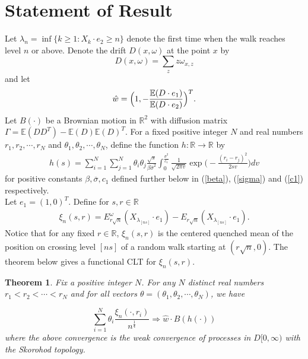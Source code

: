 \documentclass[11pt]{amsart}
\newtheorem{theorem}{\sc Theorem}[section]
\begin{document}
\bigskip

\section{Statement of Result}

Let $\lambda_n = \inf \{k\ge 1:X_k \cdot e_2 \geq n \}$ denote the first time when the walk reaches level $n$ or above. Denote the drift $D(x,\omega)$ at the point $x$ by 
\[ D(x,\omega) = \sum_{z}z \omega_{x,z} \]
and let
\begin{eqnarray}
 \label{w}
 \hat{w}= \Big{(}1, - \frac{\mathbb{E}(D\cdot e_1)}{\mathbb{E}(D\cdot e_2)} \Big{)}^T .
\end{eqnarray}
Let $B(\cdot)$ be a Brownian motion in $\mathbb{R}^2$ with diffusion matrix $\Gamma=\mathbb{E}(DD^{T})-\mathbb{E}(D)\mathbb{E}(D)^{T}$. For a fixed positive integer $N$ and real numbers $r_1,r_2,\cdots,r_N$ and $\theta_1,\theta_2,\cdots,\theta_N$, define the function $h:\mathbb{R} \to \mathbb{R}$ by  
\begin{eqnarray}
\label{h}
h(s)=\sum_{i=1}^N \sum_{j=1}^N \theta_i \theta_j\frac{\sqrt{s}}{\beta \overline{\sigma}^2}\int_0^{\frac{\overline{\sigma}^2}{c_1}} \frac{1}{\sqrt{2\pi v}} \exp\big( -\frac{(r_i-r_j)^2}{2sv} \big) dv
 
\end{eqnarray}
for positive constants $\beta, \overline{\sigma}, c_1$ defined further below in (\ref{beta}), (\ref{sigma}) and (\ref{c1}) respectively.\\
Let $e_1=(1,0)^T$. Define for $s,r \in \mathbb{R}$
\begin{eqnarray}
 \label{xi} 
 \xi_n(s,r)= E_{r\sqrt{n}}^{\omega}(X_{\lambda_{[ns]}}\cdot e_1)-E_{r\sqrt{n}}(X_{\lambda_{[ns]}}\cdot e_1).
\end{eqnarray}
Notice that for any fixed $r \in \mathbb{R}$, $\xi_n(s,r)$ is the centered quenched mean of the position on crossing level $[ns]$ of a random walk starting at $(r\sqrt{n},0)$. The theorem below gives a functional CLT for $\xi_n(s,r)$.

\bigskip

\begin{theorem}
\label{theorem}
Fix a positive integer $N$. For any $N$ distinct real numbers $r_1<r_2<\cdots < r_N$ and for all vectors $\mathcal{\theta}=(\theta_1,\theta_2,\cdots,\theta_N)$, we have

\[ \sum_{i=1}^N \theta_i \frac{\xi_n(\cdot,r_i) }{n^{\frac{1}{4}}} \Rightarrow \hat{w} \cdot B(h(\cdot))
 \]
where the above convergence is the weak convergence of processes in $D[0,\infty)$ with the Skorohod topology. 
\end{theorem}
\end{document}

